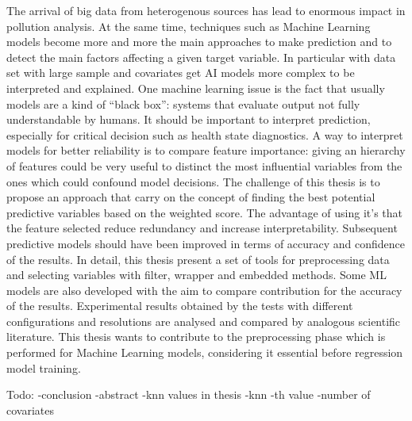 The arrival of big data from heterogenous sources has lead to enormous impact in pollution analysis.
At the same time, techniques such as Machine Learning models become more and more the main approaches to make prediction and to detect the main factors affecting a given target variable.
In particular with data set with large sample and covariates get AI models more complex to be interpreted and explained.
One machine learning issue is the fact that usually models are a kind of “black box”: systems that evaluate output not fully understandable by humans. 
It should be important to interpret prediction, especially for critical decision such as health state diagnostics.
A way to interpret models for better reliability is to compare feature importance: giving an hierarchy of features could be very useful to distinct the most influential variables from the ones which could confound model decisions.
The challenge of this thesis is to propose an approach that carry on the concept of finding the best potential predictive variables based on the weighted score.
The advantage of using it's that the feature selected reduce redundancy and increase interpretability. 
Subsequent predictive models should have been improved in terms of accuracy and confidence of the results.
In detail, this thesis present a set of tools for preprocessing data and selecting variables with filter, wrapper and embedded methods.
Some ML models are also developed with the aim to compare contribution for the accuracy of the results.
Experimental results obtained by the tests with different configurations and resolutions are analysed and compared by analogous scientific literature.
This thesis wants to contribute to the preprocessing phase which is performed for Machine Learning models, considering it essential before regression model training.

Todo:
-conclusion 
-abstract
-knn values in thesis
-knn
-th value
-number of covariates
